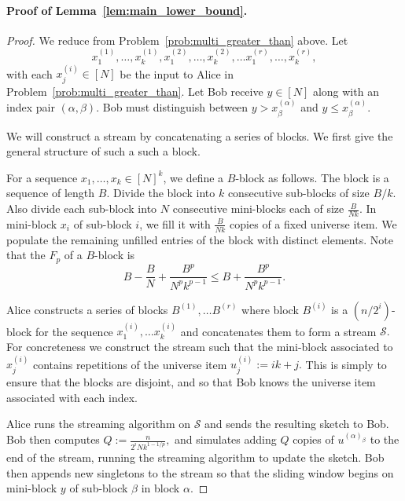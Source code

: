 \documentclass{article}
\theoremstyle{plain}
\newcommand{\window}{n}
\begin{document}
\paragraph{Proof of Lemma~\ref{lem:main_lower_bound}.}
\begin{proof}
We reduce from Problem~\ref{prob:multi_greater_than} above.  Let 
\[
x^{(1)}_1, \ldots, x^{(1)}_k, x^{(2)}_1, \ldots, x^{(2)}_k, \ldots x^{(r)}_1, \ldots, x^{(r)}_k,
\]
with each $x^{(i)}_j \in [N]$
be the input to Alice in Problem~\ref{prob:multi_greater_than}.  Let Bob receive $y \in [N]$ along with an index pair $(\alpha, \beta).$ Bob must distinguish between $y > x^{(\alpha)}_{\beta}$ and $y \leq  x^{(\alpha)}_{\beta}.$


We will construct a stream by concatenating a series of blocks.  We first give the general structure of such a such a block.

For a sequence $x_1, \ldots, x_k \in [N]^k$, we define a $B$-block as follows.
The block is a sequence of length $B.$  Divide the block into $k$ consecutive sub-blocks of size $B/k$. Also divide each sub-block into $N$ consecutive mini-blocks each of size $\frac{B}{Nk}.$  In mini-block $x_i$ of sub-block $i$, we fill it with $\frac{B}{Nk}$ copies of a fixed universe item.  We populate the remaining unfilled entries of the block with distinct elements.  Note that the $F_p$ of a $B$-block is 
\begin{equation}
\label{eq:Fp_of_block}
B - \frac{B}{N} + \frac{B^p}{N^p k^{p-1}} \leq B + \frac{B^p}{N^p k^{p-1}}.
\end{equation}

Alice constructs a series of blocks $B^{(1)}, \ldots B^{(r)}$ where block $B^{(i)}$ is a $(\window/2^i)$-block for the sequence $x^{(i)}_1, \ldots x^{(i)}_k$ and concatenates them to form a stream $\mathcal{S}.$  For concreteness we  construct the stream such that the mini-block associated to $x^{(i)}_j$ contains repetitions of the universe item $u^{(i)}_j := ik + j.$ This is simply to ensure that the blocks are disjoint, and so that Bob knows the universe item associated with each index.

Alice runs the streaming algorithm on $\mathcal{S}$ and sends the resulting sketch to Bob.  Bob then computes $Q := \frac{\window}{2^i N k^{1 - 1/p}},$ and simulates adding $Q$ copies of $u^{(\alpha)_{\beta}}$ to the end of the stream, running the streaming algorithm to update the sketch.  Bob then appends new singletons to the stream so that the sliding window begins on mini-block $y$ of sub-block $\beta$ in block $\alpha.$


\end{proof}
\end{document}
